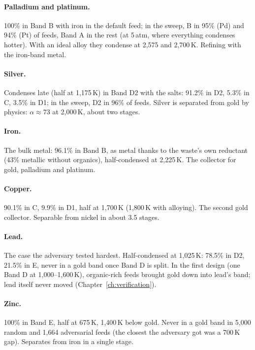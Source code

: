 \documentclass[11pt,a4paper]{article}
\begin{document}
\paragraph{Palladium and platinum.} 100\% in Band B with iron in the default feed; in the sweep, B in 95\% (Pd) and 94\% (Pt) of feeds, Band A in the rest (at 5\,atm, where everything condenses hotter). With an ideal alloy they condense at 2,575 and 2,700\,K. Refining with the iron-band metal.

\paragraph{Silver.} Condenses late (half at 1,175\,K) in Band D2 with the salts: 91.2\% in D2, 5.3\% in C, 3.5\% in D1; in the sweep, D2 in 96\% of feeds. Silver is separated from gold by physics: $\alpha \approx 73$ at 2,000\,K, about two stages.

\paragraph{Iron.} The bulk metal: 96.1\% in Band B, as metal thanks to the waste's own reductant (43\% metallic without organics), half-condensed at 2,225\,K. The collector for gold, palladium and platinum.

\paragraph{Copper.} 90.1\% in C, 9.9\% in D1, half at 1,700\,K (1,800\,K with alloying). The second gold collector. Separable from nickel in about 3.5 stages.

\paragraph{Lead.} The case the adversary tested hardest. Half-condensed at 1,025\,K: 78.5\% in D2, 21.5\% in E, never in a gold band once Band D is split. In the first design (one Band D at 1,000--1,600\,K), organic-rich feeds brought gold down into lead's band; lead itself never moved (Chapter~\ref{ch:verification}).

\paragraph{Zinc.} 100\% in Band E, half at 675\,K, 1,400\,K below gold. Never in a gold band in 5,000 random and 1,664 adversarial feeds (the closest the adversary got was a 700\,K gap). Separates from iron in a single stage.
\end{document}
